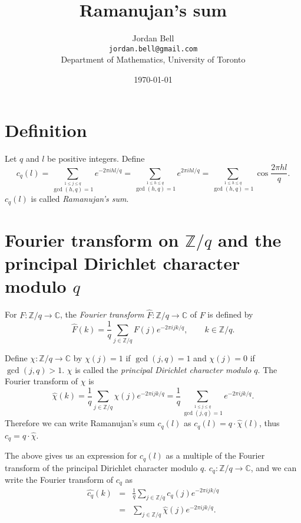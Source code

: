 \documentclass{article}
\begin{document}
\title{Ramanujan's sum}
\author{Jordan Bell\\ \texttt{jordan.bell@gmail.com}\\Department of Mathematics, University of Toronto}
\date{\today}

\maketitle

\section{Definition}
Let $q$ and $l$ be positive integers.
Define
\[
c_q(l)=\sum_{\stackrel{1 \leq j \leq q}{\gcd(h,q)=1}} e^{-2\pi i  hl/q}
=\sum_{\stackrel{1 \leq h \leq q}{\gcd(h,q)=1}} e^{2\pi i  hl/q}
=\sum_{\stackrel{1 \leq h \leq q}{\gcd(h,q)=1}} \cos \frac{2\pi  hl}{q}.
\]
$c_q(l)$ is called {\em Ramanujan's sum}.

\section{Fourier transform on $\mathbb{Z}/q$ and the principal Dirichlet character modulo $q$}
For $F:\mathbb{Z}/q \to \mathbb{C}$, the {\em Fourier transform} $\widehat{F}:\mathbb{Z}/q \to \mathbb{C}$ of $F$ is defined by
\[
\widehat{F}(k)=\frac{1}{q} \sum_{j \in \mathbb{Z}/q} F(j) e^{-2\pi i  jk/q}, \qquad k \in \mathbb{Z}/q.
\]

Define $\chi:\mathbb{Z}/q \to \mathbb{C}$ by $\chi(j)=1$ if $\gcd(j,q)=1$ and $\chi(j)=0$ if $\gcd(j,q)>1$.
$\chi$ is called the {\em principal Dirichlet character modulo $q$}.
The Fourier transform of $\chi$ is
\[
\widehat{\chi}(k)=\frac{1}{q} \sum_{j \in \mathbb{Z}/q} \chi(j) e^{-2\pi i  jk/q} 
=\frac{1}{q} \sum_{\stackrel{1 \leq j \leq q}{\gcd(j,q)=1}} e^{-2\pi i  jk/q}.
\]
Therefore we can write  Ramanujan's sum $c_q(l)$ as $c_q(l)=q\cdot \widehat{\chi}(l)$, thus $c_q=q\cdot \widehat{\chi}$.

The above gives us an expression for $c_q(l)$ as a multiple of the Fourier transform of the principal Dirichlet character modulo $q$.
$c_q:\mathbb{Z}/q \to \mathbb{C}$, and we can write the Fourier transform of $c_q$ as
\begin{eqnarray*}
\widehat{c_q}(k)&=&\frac{1}{q} \sum_{j \in \mathbb{Z}/q} c_q(j)  e^{-2\pi i  jk/q}\\
&=&\sum_{j \in \mathbb{Z}/q} \widehat{\chi}(j) e^{-2\pi i  jk/q}.
\end{eqnarray*}
\end{document}
